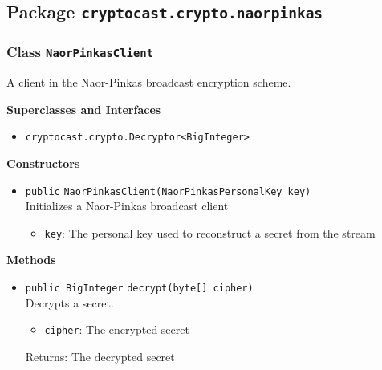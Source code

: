 \subsection{Package \lstinline!cryptocast.crypto.naorpinkas!}

\subsubsection{Class \lstinline|NaorPinkasClient|}
A client in the Naor-Pinkas broadcast encryption scheme. \\



\textbf{Superclasses and Interfaces}
\begin{itemize}
\item \lstinline|cryptocast.crypto.Decryptor<BigInteger>|
\end{itemize}



\textbf{Constructors}
\begin{itemize}
\item \lstinline|public| \lstinline|NaorPinkasClient|\lstinline|(NaorPinkasPersonalKey key)|\\
Initializes a Naor-Pinkas broadcast client
\begin{itemize}
\item \lstinline|key|: The personal key used to reconstruct a secret from the stream
\end{itemize}



\end{itemize}


\textbf{Methods}
\begin{itemize}
\item \lstinline|public BigInteger| \lstinline|decrypt|\lstinline|(byte[] cipher)|\\
Decrypts a secret.
\begin{itemize}
\item \lstinline|cipher|: The encrypted secret
\end{itemize}

Returns: The decrypted secret

\end{itemize}

